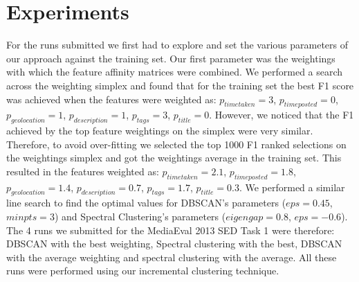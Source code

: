 \documentclass{../acm_proc_article-me11_tweaked}
\begin{document}

\section{Experiments} %
\label{sec:experiments}

For the runs submitted we first had to explore and set the various parameters of our approach against the training set. Our first parameter was the weightings with which the feature affinity matrices were combined. We performed a search across the weighting simplex and found that for the training set the best F1 score was achieved when the features were weighted as: $p_{timetaken}=3$, $p_{timeposted}=0$, $p_{geolocation}=1$, $p_{description}=1$, $p_{tags}=3$, $p_{title}=0$. However, we noticed that the F1 achieved by the top feature weightings on the simplex were very similar. Therefore, to avoid over-fitting we selected the top 1000 F1 ranked selections on the weightings simplex and got the weightings average in the training set. This resulted in the features weighted as: $p_{timetaken}=2.1$, $p_{timeposted}=1.8$, $p_{geolocation}=1.4$, $p_{description}=0.7$, $p_{tags}=1.7$, $p_{title}=0.3$. We performed a similar line search to find the optimal values for DBSCAN's parameters ($eps=0.45$, $minpts=3$) and Spectral Clustering's parameters ($eigengap=0.8$, $eps=-0.6$). The 4 runs we submitted for the MediaEval 2013 SED Task 1 were therefore: DBSCAN with the best weighting, Spectral clustering with the best, DBSCAN with the average weighting and spectral clustering with the average. All these runs were performed using our incremental clustering technique.




\end{document}
